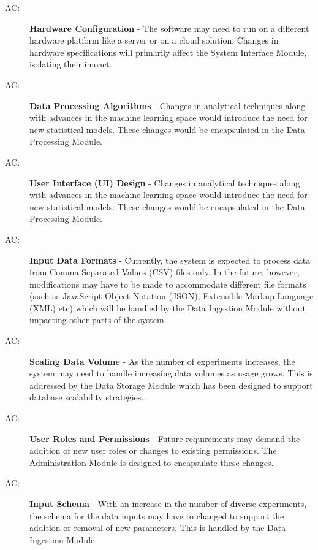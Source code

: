 \documentclass[12pt, titlepage]{article}
\newcounter{acnum}
\newcommand{\actheacnum}{AC\theacnum}
\begin{document}
\begin{description}
  \item[ \actheacnum \label{acHardware}:] \textbf{Hardware Configuration} - 
  The software may need to run on a different hardware platform like a server or on a 
  cloud solution. Changes in hardware specifications will primarily affect the System Interface 
  Module, isolating their imoact.
  
  \item[ \actheacnum \label{acProcessing}:] \textbf{Data Processing Algorithms} - 
  Changes in analytical techniques along with advances in the machine learning space would
  introduce the need for new statistical models. These changes would be encapsulated in the
  Data Processing Module.

  \item[ \actheacnum \label{acInterface}:] \textbf{User Interface (UI) Design} - 
  Changes in analytical techniques along with advances in the machine learning space would
  introduce the need for new statistical models. These changes would be encapsulated in the
  Data Processing Module.

  \item[ \actheacnum \label{acInput}:] \textbf{Input Data Formats} - 
  Currently, the system is expected to process data from Comma Separated Values (CSV) files only.
  In the future, however, modifications may have to be made to accommodate different file 
  formats (such as JavaScript Object Notation (JSON), Extensible Markup Language (XML) etc)
  which will be handled by the Data Ingestion Module without impacting other parts of the system.

  \item[ \actheacnum \label{acScaling}:] \textbf{Scaling Data Volume} - 
  As the number of experiments increases, the system may need to handle increasing data volumes
  as usage grows. This is addressed by the Data Storage Module which has been designed to support
  database scalability strategies.

  \item[ \actheacnum \label{acRoles}:] \textbf{User Roles and Permissions} - 
  Future requirements may demand the addition of new user roles or changes to existing permissions.
  The Administration Module is designed to encapsulate these changes.

  \item[ \actheacnum \label{acSchema}:] \textbf{Input Schema} - 
  With an increase in the number of diverse experiments, the schema for the data inputs may have to
  changed to support the addition or removal of new parameters. This is handled by the Data Ingestion
  Module.


\end{description}
\end{document}
